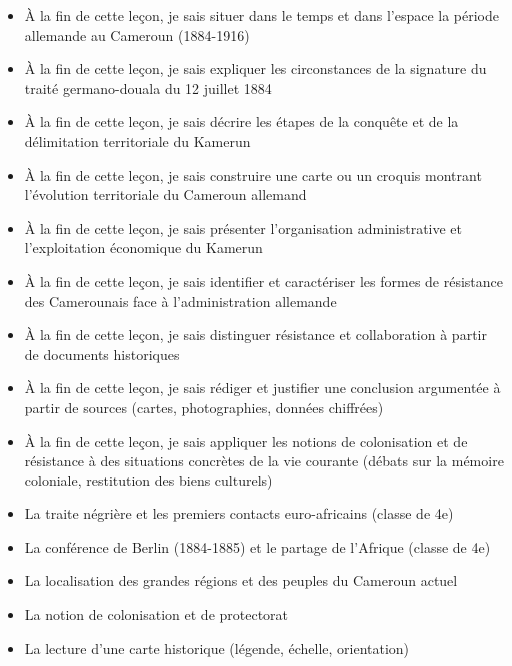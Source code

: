 \documentclass[11pt]{article}
\begin{document}
\begin{objectifs}
\begin{itemize}
\item À la fin de cette leçon, je sais situer dans le temps et dans l'espace la période allemande au Cameroun (1884-1916)
\item À la fin de cette leçon, je sais expliquer les circonstances de la signature du traité germano-douala du 12 juillet 1884
\item À la fin de cette leçon, je sais décrire les étapes de la conquête et de la délimitation territoriale du Kamerun
\item À la fin de cette leçon, je sais construire une carte ou un croquis montrant l'évolution territoriale du Cameroun allemand
\item À la fin de cette leçon, je sais présenter l'organisation administrative et l'exploitation économique du Kamerun
\item À la fin de cette leçon, je sais identifier et caractériser les formes de résistance des Camerounais face à l'administration allemande
\item À la fin de cette leçon, je sais distinguer résistance et collaboration à partir de documents historiques
\item À la fin de cette leçon, je sais rédiger et justifier une conclusion argumentée à partir de sources (cartes, photographies, données chiffrées)
\item À la fin de cette leçon, je sais appliquer les notions de colonisation et de résistance à des situations concrètes de la vie courante (débats sur la mémoire coloniale, restitution des biens culturels)
\end{itemize}
\end{objectifs}

\begin{prerequis}
\begin{itemize}
\item La traite négrière et les premiers contacts euro-africains (classe de 4e)
\item La conférence de Berlin (1884-1885) et le partage de l'Afrique (classe de 4e)
\item La localisation des grandes régions et des peuples du Cameroun actuel
\item La notion de colonisation et de protectorat
\item La lecture d'une carte historique (légende, échelle, orientation)
\end{itemize}
\end{prerequis}
\end{document}
